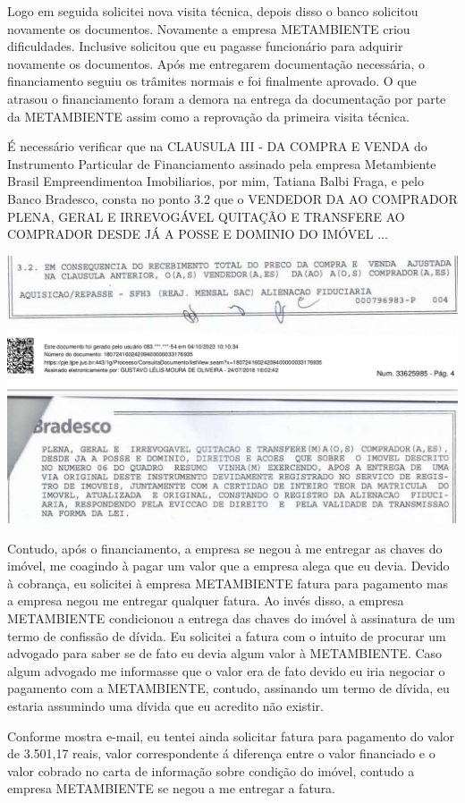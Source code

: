 \documentclass[11pt]{letter}
\begin{document}
Logo em seguida solicitei nova visita técnica, depois disso o banco solicitou novamente os documentos. Novamente a empresa METAMBIENTE criou dificuldades. Inclusive solicitou que eu pagasse funcionário para adquirir novamente os documentos. Após me entregarem documentação necessária, o financiamento seguiu os trâmites normais e foi finalmente aprovado. O que atrasou o financiamento foram a demora na entrega da documentação por parte da METAMBIENTE assim como a reprovação da primeira visita técnica. 

É necessário verificar que na CLAUSULA III - DA COMPRA E VENDA do Instrumento Particular de Financiamento assinado pela empresa Metambiente Brasil Empreendimentoa Imobiliarios, por mim, Tatiana Balbi Fraga, e pelo Banco Bradesco,  consta no ponto 3.2 que o VENDEDOR DA AO COMPRADOR PLENA, GERAL E IRREVOGÁVEL QUITAÇÃO E TRANSFERE AO COMPRADOR DESDE JÁ A POSSE E DOMINIO DO IMÓVEL ... 

\includegraphics[width=\textwidth]{doc2.png}

Contudo, após o financiamento, a empresa se negou à me entregar as chaves do imóvel, me coagindo à pagar um valor que a empresa alega que eu devia. Devido à cobrança, eu solicitei à empresa METAMBIENTE fatura para pagamento mas a empresa negou me entregar qualquer fatura. Ao invés disso, a empresa METAMBIENTE condicionou a entrega das chaves do imóvel à assinatura de um termo de confissão de dívida. Eu solicitei a fatura com o intuito de procurar um advogado para saber se de fato eu devia algum valor à METAMBIENTE. Caso algum advogado me informasse que o valor era de fato devido eu iria negociar o pagamento com a METAMBIENTE, contudo, assinando um termo de dívida, eu estaria assumindo uma dívida que eu acredito não existir. 

Conforme mostra e-mail, eu tentei ainda solicitar fatura para pagamento do valor de 3.501,17 reais, valor correspondente á diferença entre o valor financiado e o valor cobrado no carta de informação sobre condição do imóvel, contudo a empresa METAMBIENTE se negou a me entregar a fatura. 
\end{document}
